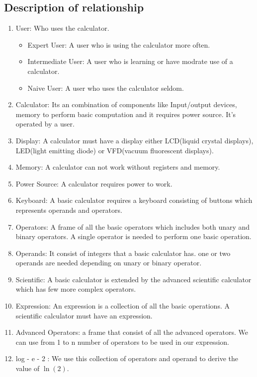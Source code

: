 \documentclass{article}
\begin{document}
\subsection{Description of relationship}
\begin{enumerate}
    \item User: Who uses the calculator.
    \begin{itemize}
        \item Expert User: A user who is using the calculator more often.
        \item Intermediate User: A user who is learning or have modrate use of a calculator.
        \item Naive User: A user who uses the calculator seldom. 
    \end{itemize}
    \item Calculator: Its an combination of components like Input/output devices, memory to perform basic computation and it requires power source. It's operated by a user.
    \item Display: A calculator must have a display either LCD(liquid crystal displays), LED(light emitting diode) or VFD(vacuum fluorescent displays).
    \item Memory: A calculator can not work without registers and memory.
    \item Power Source: A calculator requires power to work.
    \item Keyboard: A basic calculator requires a keyboard consisting of buttons which represents operands and operators.
    \item Operators: A frame of all the basic operators which includes both unary and binary operators. A single operator is needed to perform one basic operation.
    \item Operands: It consist of integers that a basic calculator has. one or two operands are needed depending on unary or binary operator.
    \item Scientific: A basic calculator is extended by the advanced scientific calculator which has few more complex operators.
    \item Expression: An expression is a collection of all the basic operations. A scientific calculator must have an expression.
    \item Advanced Operators: a frame that consist of all the advanced operators. We can use from 1 to n number of operators to be used in our expression.
    \item log - e - 2 : We use this collection of operators and operand to derive the value of $\ln(2)$.

\end{enumerate}
\end{document}
